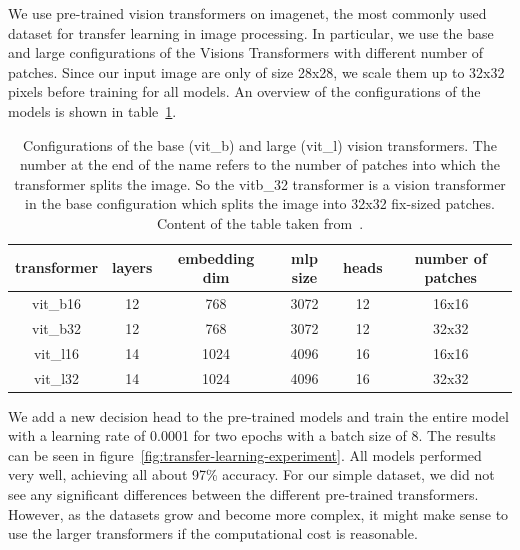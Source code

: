 \documentclass[a4paper]{scrartcl}
\begin{document}
    We use pre-trained vision transformers on imagenet, the most commonly used dataset for transfer learning in image processing.
    In particular, we use the base and large configurations of the Visions Transformers with different number of patches.
    Since our input image are only of size 28x28, we scale them up to 32x32 pixels before training for all models.
    An overview of the configurations of the models is shown in table~\ref{tab:vit-configurations}.

    \begin{table}[ht]
        \centering
        \begin{tabular}{ | c | c | c | c | c | c |}
            \hline
            transformer & layers & embedding dim & mlp size & heads & number of patches \\
            \hline
            vit\_b16    & 12     & 768           & 3072     & 12    & 16x16             \\
            vit\_b32    & 12     & 768           & 3072     & 12    & 32x32             \\
            vit\_l16    & 14     & 1024          & 4096     & 16    & 16x16             \\
            vit\_l32    & 14     & 1024          & 4096     & 16    & 32x32             \\
            \hline
        \end{tabular}
        \caption[Configurations of the Vision Transformers used for Transfer Learning]{
            Configurations of the base (vit\_b) and large (vit\_l) vision transformers.
            The number at the end of the name refers to the number of patches into which the transformer splits the image.
            So the vitb\_32 transformer is a vision transformer in the base configuration which splits the image into 32x32 fix-sized patches.
            Content of the table taken from~\cite{dosovitskiy2021image}.
        }\label{tab:vit-configurations}
    \end{table}

    We add a new decision head to the pre-trained models and train the entire model with a learning rate of 0.0001 for two epochs with a batch size of 8.
    The results can be seen in figure~\ref{fig:transfer-learning-experiment}.
    All models performed very well, achieving all about 97\% accuracy.
    For our simple dataset, we did not see any significant differences between the different pre-trained transformers.
    However, as the datasets grow and become more complex, it might make sense to use the larger transformers if the computational cost is reasonable.
\end{document}
